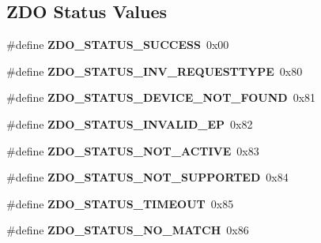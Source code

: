 \subsection*{Z\-D\-O Status Values}
\begin{DoxyCompactItemize}
\item 
\hypertarget{group__zdo_gaca852eaafe6a2a7e8fc42a2963d473bf}{\#define {\bfseries Z\-D\-O\-\_\-\-S\-T\-A\-T\-U\-S\-\_\-\-S\-U\-C\-C\-E\-S\-S}~0x00}\label{group__zdo_gaca852eaafe6a2a7e8fc42a2963d473bf}

\item 
\hypertarget{group__zdo_ga4e093ba54e396ff7c323fab9ea077d18}{\#define {\bfseries Z\-D\-O\-\_\-\-S\-T\-A\-T\-U\-S\-\_\-\-I\-N\-V\-\_\-\-R\-E\-Q\-U\-E\-S\-T\-T\-Y\-P\-E}~0x80}\label{group__zdo_ga4e093ba54e396ff7c323fab9ea077d18}

\item 
\hypertarget{group__zdo_ga539854426a1115ab577f821085ff2256}{\#define {\bfseries Z\-D\-O\-\_\-\-S\-T\-A\-T\-U\-S\-\_\-\-D\-E\-V\-I\-C\-E\-\_\-\-N\-O\-T\-\_\-\-F\-O\-U\-N\-D}~0x81}\label{group__zdo_ga539854426a1115ab577f821085ff2256}

\item 
\hypertarget{group__zdo_gac3028cb83e21749768eca42838263019}{\#define {\bfseries Z\-D\-O\-\_\-\-S\-T\-A\-T\-U\-S\-\_\-\-I\-N\-V\-A\-L\-I\-D\-\_\-\-E\-P}~0x82}\label{group__zdo_gac3028cb83e21749768eca42838263019}

\item 
\hypertarget{group__zdo_ga557bd739746cc08113ede4935c1918f2}{\#define {\bfseries Z\-D\-O\-\_\-\-S\-T\-A\-T\-U\-S\-\_\-\-N\-O\-T\-\_\-\-A\-C\-T\-I\-V\-E}~0x83}\label{group__zdo_ga557bd739746cc08113ede4935c1918f2}

\item 
\hypertarget{group__zdo_gadd64e2c0f5b7126a0c906f0ec6e60473}{\#define {\bfseries Z\-D\-O\-\_\-\-S\-T\-A\-T\-U\-S\-\_\-\-N\-O\-T\-\_\-\-S\-U\-P\-P\-O\-R\-T\-E\-D}~0x84}\label{group__zdo_gadd64e2c0f5b7126a0c906f0ec6e60473}

\item 
\hypertarget{group__zdo_gaea9de0d4efef9cd1d1ae12dae22f1d37}{\#define {\bfseries Z\-D\-O\-\_\-\-S\-T\-A\-T\-U\-S\-\_\-\-T\-I\-M\-E\-O\-U\-T}~0x85}\label{group__zdo_gaea9de0d4efef9cd1d1ae12dae22f1d37}

\item 
\hypertarget{group__zdo_ga00eda593d9937e6c55f9da1ab509091f}{\#define {\bfseries Z\-D\-O\-\_\-\-S\-T\-A\-T\-U\-S\-\_\-\-N\-O\-\_\-\-M\-A\-T\-C\-H}~0x86}\label{group__zdo_ga00eda593d9937e6c55f9da1ab509091f}


\end{DoxyCompactItemize}
